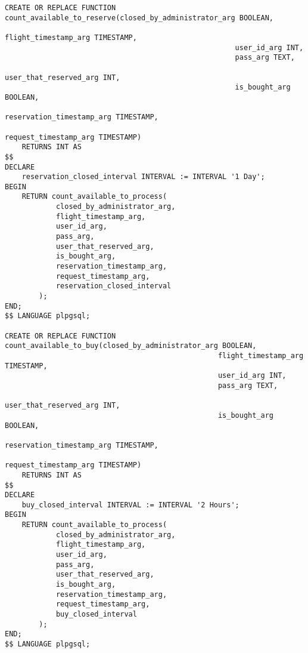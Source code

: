 \documentclass{article}
\begin{document}
\begin{verbatim}
CREATE OR REPLACE FUNCTION count_available_to_reserve(closed_by_administrator_arg BOOLEAN,
                                                      flight_timestamp_arg TIMESTAMP,
                                                      user_id_arg INT,
                                                      pass_arg TEXT,
                                                      user_that_reserved_arg INT,
                                                      is_bought_arg BOOLEAN,
                                                      reservation_timestamp_arg TIMESTAMP,
                                                      request_timestamp_arg TIMESTAMP)
    RETURNS INT AS
$$
DECLARE
    reservation_closed_interval INTERVAL := INTERVAL '1 Day';
BEGIN
    RETURN count_available_to_process(
            closed_by_administrator_arg,
            flight_timestamp_arg,
            user_id_arg,
            pass_arg,
            user_that_reserved_arg,
            is_bought_arg,
            reservation_timestamp_arg,
            request_timestamp_arg,
            reservation_closed_interval
        );
END;
$$ LANGUAGE plpgsql;

CREATE OR REPLACE FUNCTION count_available_to_buy(closed_by_administrator_arg BOOLEAN,
                                                  flight_timestamp_arg TIMESTAMP,
                                                  user_id_arg INT,
                                                  pass_arg TEXT,
                                                  user_that_reserved_arg INT,
                                                  is_bought_arg BOOLEAN,
                                                  reservation_timestamp_arg TIMESTAMP,
                                                  request_timestamp_arg TIMESTAMP)
    RETURNS INT AS
$$
DECLARE
    buy_closed_interval INTERVAL := INTERVAL '2 Hours';
BEGIN
    RETURN count_available_to_process(
            closed_by_administrator_arg,
            flight_timestamp_arg,
            user_id_arg,
            pass_arg,
            user_that_reserved_arg,
            is_bought_arg,
            reservation_timestamp_arg,
            request_timestamp_arg,
            buy_closed_interval
        );
END;
$$ LANGUAGE plpgsql;


\end{verbatim}
\end{document}
